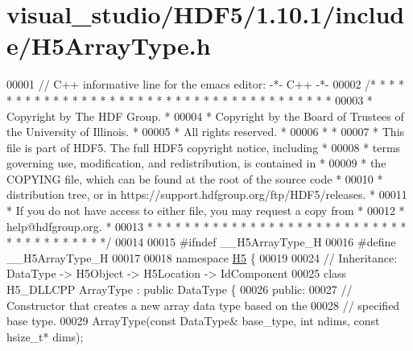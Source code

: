 \hypertarget{visual__studio_2_h_d_f5_21_810_81_2include_2_h5_array_type_8h_source}{}\section{visual\+\_\+studio/\+H\+D\+F5/1.10.1/include/\+H5\+Array\+Type.h}
\label{visual__studio_2_h_d_f5_21_810_81_2include_2_h5_array_type_8h_source}

\begin{DoxyCode}
00001 \textcolor{comment}{// C++ informative line for the emacs editor: -*- C++ -*-}
00002 \textcolor{comment}{/* * * * * * * * * * * * * * * * * * * * * * * * * * * * * * * * * * * * * * *}
00003 \textcolor{comment}{ * Copyright by The HDF Group.                                               *}
00004 \textcolor{comment}{ * Copyright by the Board of Trustees of the University of Illinois.         *}
00005 \textcolor{comment}{ * All rights reserved.                                                      *}
00006 \textcolor{comment}{ *                                                                           *}
00007 \textcolor{comment}{ * This file is part of HDF5.  The full HDF5 copyright notice, including     *}
00008 \textcolor{comment}{ * terms governing use, modification, and redistribution, is contained in    *}
00009 \textcolor{comment}{ * the COPYING file, which can be found at the root of the source code       *}
00010 \textcolor{comment}{ * distribution tree, or in https://support.hdfgroup.org/ftp/HDF5/releases.  *}
00011 \textcolor{comment}{ * If you do not have access to either file, you may request a copy from     *}
00012 \textcolor{comment}{ * help@hdfgroup.org.                                                        *}
00013 \textcolor{comment}{ * * * * * * * * * * * * * * * * * * * * * * * * * * * * * * * * * * * * * * */}
00014 
00015 \textcolor{preprocessor}{#ifndef \_\_H5ArrayType\_H}
00016 \textcolor{preprocessor}{#define \_\_H5ArrayType\_H}
00017 
00018 \textcolor{keyword}{namespace }\hyperlink{namespace_h5}{H5} \{
00019 
00024 \textcolor{comment}{//  Inheritance: DataType -> H5Object -> H5Location -> IdComponent}
00025 \textcolor{keyword}{class }H5\_DLLCPP ArrayType : \textcolor{keyword}{public} DataType \{
00026    \textcolor{keyword}{public}:
00027         \textcolor{comment}{// Constructor that creates a new array data type based on the}
00028         \textcolor{comment}{// specified base type.}
00029         ArrayType(\textcolor{keyword}{const} DataType& base\_type, \textcolor{keywordtype}{int} ndims, \textcolor{keyword}{const} hsize\_t* dims);

\end{DoxyCode}

